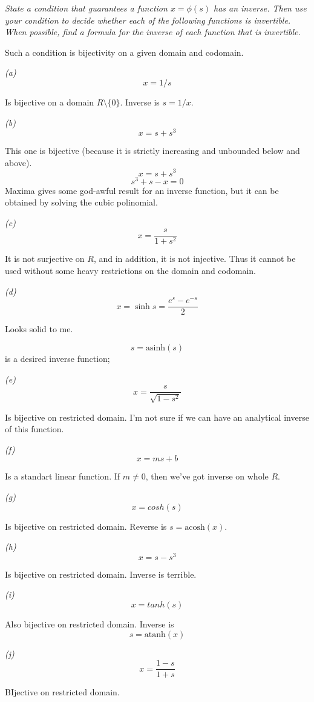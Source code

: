 \documentclass[11pt,oneside,titlepage]{book}
\begin{document}
\textit{State a condition that guarantees a function $x = \phi(s)$ has an inverse. Then use
  your condition to decide whether each of the following functions is invertible. When possible,
  find a formula for the inverse of each function that is invertible.}

Such a condition is bijectivity on a given domain and codomain.

\textit{(a)}
$$x = 1/s$$

Is bijective on a domain $R \setminus \{0\}$. Inverse is $s = 1/x$.

\textit{(b)}
$$x = s + s^3$$

This one is bijective (because it is strictly increasing and unbounded below and above).
$$x = s + s^3$$
$$s^3 + s - x = 0$$
Maxima gives some god-awful result for an inverse function, but it can be obtained by solving the
cubic polinomial.

\textit{(c)}
$$x = \frac{s}{1 + s^2}$$

It is not surjective on $R$, and in addition, it is not injective. Thus it cannot be used
without some heavy restrictions on the domain and codomain.

\textit{(d)}
$$x = \sinh s = \frac{e^s - e^{-s}}{2}$$

Looks solid to me.

$$s = \text{asinh}(s)$$
is a desired inverse function;

\textit{(e)}
$$x = \frac{s}{\sqrt{1 - s^2}}$$

Is bijective on restricted domain. I'm not sure if we can have an analytical inverse of this
function.

\textit{(f)}
$$x = ms + b$$

Is a standart linear function. If $m \neq 0$, then we've got inverse on whole $R$.

\textit{(g)}
$$x = cosh(s)$$

Is bijective on restricted domain. Reverse is $s = \text{acosh}(x)$.

\textit{(h)}
$$x = s - s^3$$

Is bijective on restricted domain. Inverse is terrible.


\textit{(i)}
$$x = tanh(s)$$

Also bijective on restricted domain. Inverse is
$$s = \text{atanh}(x)$$

\textit{(j)}
$$x = \frac{1 - s}{1 + s}$$

BIjective on restricted domain.

\section{}
\end{document}
